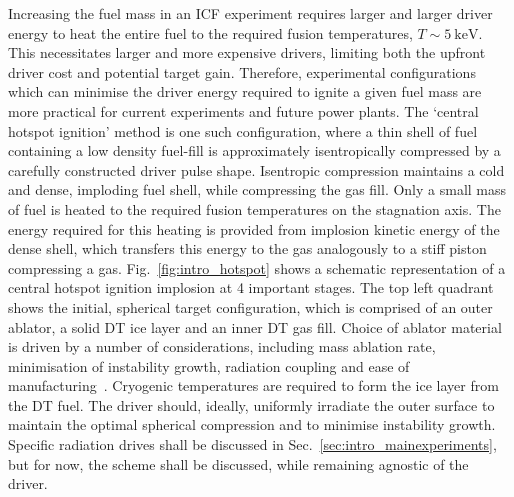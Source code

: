 Increasing the fuel mass in an \ac{ICF} experiment requires larger and larger driver energy to heat the entire fuel to the required fusion temperatures, $T\sim5\ \text{keV}$.
This necessitates larger and more expensive drivers, limiting both the upfront driver cost and potential target gain.
Therefore, experimental configurations which can minimise the driver energy required to ignite a given fuel mass are more practical for current experiments and future power plants.
The `central hotspot ignition' method is one such configuration, where a thin shell of fuel containing a low density fuel-fill is approximately isentropically compressed by a carefully constructed driver pulse shape.
Isentropic compression maintains a cold and dense, imploding fuel shell, while compressing the gas fill.
Only a small mass of fuel is heated to the required fusion temperatures on the stagnation axis.
The energy required for this heating is provided from implosion kinetic energy of the dense shell, which transfers this energy to the gas analogously to a stiff piston compressing a gas.
Fig.~\ref{fig:intro_hotspot} shows a schematic representation of a central hotspot ignition implosion at 4 important stages.
The top left quadrant shows the initial, spherical target configuration, which is comprised of an outer ablator, a solid DT ice layer and an inner DT gas fill.
Choice of ablator material is driven by a number of considerations, including mass ablation rate, minimisation of instability growth, radiation coupling and ease of manufacturing~\cite{lafon_directdriveignition_2015,kline_first_2016,hu_laserdirectdrive_2023,casey_performance_2015}.
Cryogenic temperatures are required to form the ice layer from the DT fuel.
The driver should, ideally, uniformly irradiate the outer surface to maintain the optimal spherical compression and to minimise instability growth.
Specific radiation drives shall be discussed in Sec.~\ref{sec:intro_mainexperiments}, but for now, the scheme shall be discussed, while remaining agnostic of the driver.

